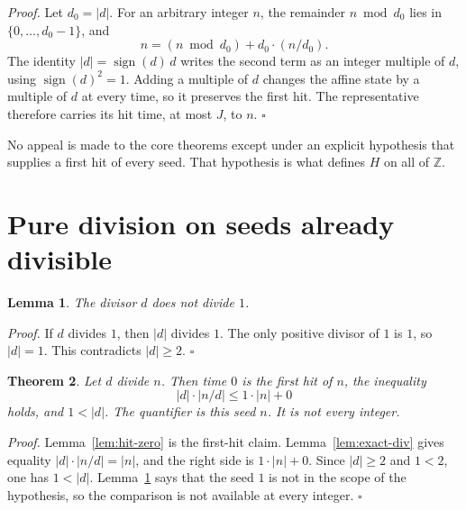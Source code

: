 \documentclass[11pt,letterpaper]{article}
\newcommand{\Z}{\mathbb{Z}}
\newtheorem{theorem}{Theorem}
\newtheorem{lemma}[theorem]{Lemma}
\newenvironment{proof}{\noindent\textit{Proof.}}{\hfill\(\square\)}
\begin{document}
\begin{proof}
Let \(d_0=\lvert d\rvert\). For an arbitrary integer \(n\), the remainder \(n\bmod d_0\) lies in \(\{0,\ldots,d_0-1\}\), and
\[
n=(n\bmod d_0)+d_0\cdot(n/d_0).
\]
The identity \(\lvert d\rvert=\operatorname{sign}(d)\,d\) writes the second term as an integer multiple of \(d\), using \(\operatorname{sign}(d)^2=1\). Adding a multiple of \(d\) changes the affine state by a multiple of \(d\) at every time, so it preserves the first hit. The representative therefore carries its hit time, at most \(J\), to \(n\).
\end{proof}

No appeal is made to the core theorems except under an explicit hypothesis that supplies a first hit of every seed. That hypothesis is what defines \(H\) on all of \(\Z\).

\section{Pure division on seeds already divisible}

\begin{lemma}
\label{lem:misses-one}
The divisor \(d\) does not divide \(1\).
\end{lemma}

\begin{proof}
If \(d\) divides \(1\), then \(\lvert d\rvert\) divides \(1\). The only positive divisor of \(1\) is \(1\), so \(\lvert d\rvert=1\). This contradicts \(\lvert d\rvert\ge 2\).
\end{proof}

\begin{theorem}
\label{thm:pure-division}
Let \(d\) divide \(n\). Then time \(0\) is the first hit of \(n\), the inequality
\[
\lvert d\rvert\cdot\lvert n/d\rvert\le 1\cdot\lvert n\rvert+0
\]
holds, and \(1<\lvert d\rvert\). The quantifier is this seed \(n\). It is not every integer.
\end{theorem}

\begin{proof}
Lemma~\ref{lem:hit-zero} is the first-hit claim. Lemma~\ref{lem:exact-div} gives equality \(\lvert d\rvert\cdot\lvert n/d\rvert=\lvert n\rvert\), and the right side is \(1\cdot\lvert n\rvert+0\). Since \(\lvert d\rvert\ge 2\) and \(1<2\), one has \(1<\lvert d\rvert\). Lemma~\ref{lem:misses-one} says that the seed \(1\) is not in the scope of the hypothesis, so the comparison is not available at every integer.
\end{proof}
\end{document}
